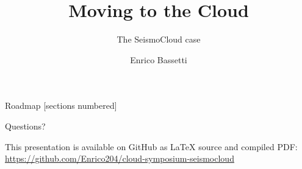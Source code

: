 \documentclass[10pt]{beamer}
\title{Moving to the Cloud}
\subtitle{The SeismoCloud case}
\date{}
\author{Enrico Bassetti}
\institute{Cloud Computing course \\ Sapienza, University of Rome}
\begin{document}

\maketitle

\begin{frame}{Roadmap}
  [sections numbered]
  \tableofcontents[hideallsubsections]
\end{frame}










\begin{frame}[standout]
  \Huge Questions?
\end{frame}

\begin{frame}{}
  \begin{center}\ccbysa\end{center}

  \small This presentation is available on GitHub as LaTeX source and compiled PDF: \\
  \url{https://github.com/Enrico204/cloud-symposium-seismocloud}
\end{frame}
\end{document}
